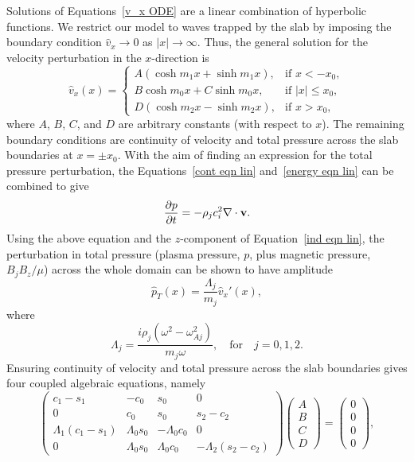 \documentclass[12pt,draft]{../style-files/ociamthesis}
\begin{document}
Solutions of Equations~\eqref{v_x ODE} are a linear combination of hyperbolic functions. We restrict our model to waves trapped by the slab by imposing the boundary condition $\hat{v}_x \to 0$ as $|x| \to \infty$. Thus, the general solution for the velocity perturbation in the $x$-direction is
\begin{equation}
\hat{v}_x(x)=
\begin{cases}
A(\cosh{m_1x} + \sinh{m_1x}), & \text{if } x < -x_0, \\
B\cosh{m_0x} + C\sinh{m_0x}, & \text{if } |x| \leq {x_0}, \\
D(\cosh{m_2x} - \sinh{m_2x}), & \text{if  } x > x_0, 
\end{cases} \label{vsoln}
\end{equation}
where $A$, $B$, $C$, and $D$ are arbitrary constants (with respect to $x$). The remaining boundary conditions are continuity of velocity and total pressure across the slab boundaries at $x = \pm{x_0}$. With the aim of finding an expression for the total pressure perturbation, the Equations~\eqref{cont eqn lin} and~\eqref{energy eqn lin} can be combined to give
\begin{equation}
	\frac{\partial p}{\partial t} = - \rho_jc_i^2\nabla\cdot\mathbf{v}.
\end{equation}
Using the above equation and the $z$-component of Equation~\eqref{ind eqn lin}, the perturbation in total pressure (plasma pressure, $p$, plus magnetic pressure, $B_jB_z/\mu$) across the whole domain can be shown to have amplitude
\begin{equation}
\hat{p}_T(x) = \frac{\Lambda_j}{m_j}\hat{v}_x'(x), \label{tot p}
\end{equation}
where
\begin{equation}
\Lambda_j = \frac{i\rho_j(\omega^2 - \omega_{Aj}^2)}{m_j\omega}, \quad \text{for} \quad j = 0, 1, 2. \label{Lambdas}
\end{equation}
Ensuring continuity of velocity and total pressure across the slab boundaries gives four coupled algebraic equations, namely
\begin{equation}
\left(
\begin{matrix}
c_1-s_1             &-c_0           &s_0            &0                   \\
0                   &c_0            &s_0            &s_2-c_2             \\
\Lambda_1(c_1-s_1)  &\Lambda_0s_0   &-\Lambda_0c_0  &0                   \\
0                   &\Lambda_0s_0   &\Lambda_0c_0   &-\Lambda_2(s_2-c_2)
\end{matrix}
\right)
\left(
\begin{matrix}
A \\
B \\
C \\
D
\end{matrix}
\right)
=
\left(
\begin{matrix}
0 \\
0 \\
0 \\
0
\end{matrix}
\right),
\label{coefmatrix}
\end{equation}
\end{document}
